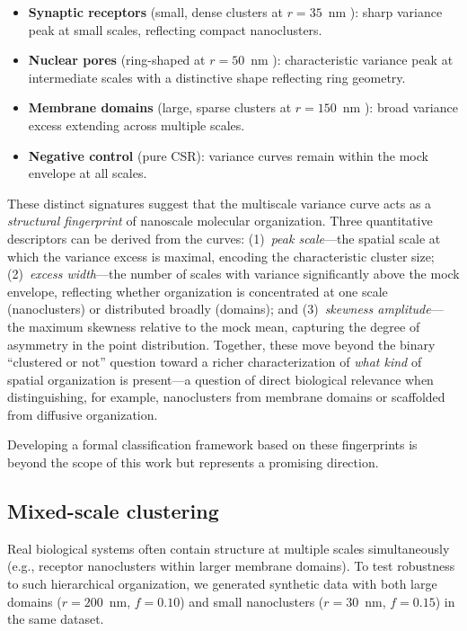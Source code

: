 \documentclass[11pt]{article}
\begin{document}
\begin{itemize}
  \item \textbf{Synaptic receptors} (small, dense clusters at $r = 35$~nm
    \citep{macgillavry2013}): sharp variance peak at small scales,
    reflecting compact nanoclusters.
  \item \textbf{Nuclear pores} (ring-shaped at $r = 50$~nm
    \citep{loschberger2012}): characteristic variance peak at intermediate
    scales with a distinctive shape reflecting ring geometry.
  \item \textbf{Membrane domains} (large, sparse clusters at $r = 150$~nm
    \citep{owen2012}): broad variance excess extending across multiple
    scales.
  \item \textbf{Negative control} (pure CSR): variance curves remain
    within the mock envelope at all scales.
\end{itemize}

These distinct signatures suggest that the multiscale variance curve
acts as a \emph{structural fingerprint} of nanoscale molecular
organization. Three quantitative descriptors can be derived from the
curves: (1)~\emph{peak scale}---the spatial scale at which the variance
excess is maximal, encoding the characteristic cluster size;
(2)~\emph{excess width}---the number of scales with variance
significantly above the mock envelope, reflecting whether organization
is concentrated at one scale (nanoclusters) or distributed broadly
(domains); and (3)~\emph{skewness amplitude}---the maximum skewness
relative to the mock mean, capturing the degree of asymmetry in the
point distribution. Together, these move beyond the binary ``clustered
or not'' question toward a richer characterization of \emph{what kind}
of spatial organization is present---a question of direct biological
relevance when distinguishing, for example, nanoclusters from membrane
domains or scaffolded from diffusive organization.

Developing a formal classification framework based on these fingerprints
is beyond the scope of this work but represents a promising direction.

\subsection{Mixed-scale clustering}
\label{sec:mixed-scale}

Real biological systems often contain structure at multiple scales
simultaneously (e.g., receptor nanoclusters within larger membrane
domains). To test robustness to such hierarchical organization, we
generated synthetic data with both large domains ($r = 200$~nm,
$f = 0.10$) and small nanoclusters ($r = 30$~nm, $f = 0.15$) in the
same dataset.
\end{document}
